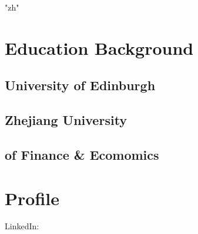 \documentclass[12pt,a4paper]{resume}
\begin{document}
\XeTeXlinebreaklocale "zh"

%
%

\vspace{3pt}
\subtitle{1991, Male, Shanghai}
\vspace{3pt}
\subtitle{TEL: 15867835270}
\vspace{3pt}
\subtitle{MAIL: junjieyemain@outlook.com}

\indent\makebox[\linewidth]{\rule{\paperwidth}{0.3pt}}



%
%
\begin{minipage}[t]{0.32\textwidth} 

\section{Education Background}

\subsection{University of Edinburgh}
\subtitle{MSc \hfill 2014/09 - 2015/11}
\sectionsep

\subsection{Zhejiang University}
\subsection{of Finance \& Ecomomics}
\subtitle{Dual Degree \hfill 2010/09 - 2014/06}
\sectionsep

\section{Profile}
LinkedIn:  \href{https://www.linkedin.com/in/junjie-ye-49477b126/}{}

\sectionsep


\end{minipage}
\end{document}
